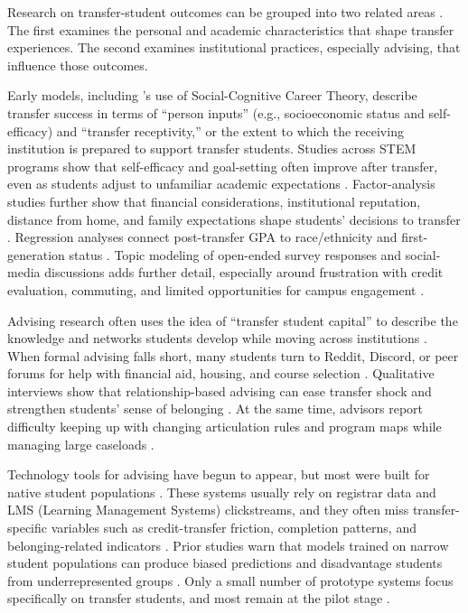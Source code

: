 \documentclass[letterpaper,11pt]{article}
\begin{document}
Research on transfer-student outcomes can be grouped into two related areas \parencite{factoranalysis2023}. The first examines the personal and academic characteristics that shape transfer experiences. The second examines institutional practices, especially advising, that influence those outcomes.

Early models, including \textcite{computingtransfer2024}'s use of Social-Cognitive Career Theory, describe transfer success in terms of ``person inputs'' (e.g., socioeconomic status and self-efficacy) and ``transfer receptivity,'' or the extent to which the receiving institution is prepared to support transfer students. Studies across STEM programs show that self-efficacy and goal-setting often improve after transfer, even as students adjust to unfamiliar academic expectations \parencite{socialcognitive2022}. Factor-analysis studies further show that financial considerations, institutional reputation, distance from home, and family expectations shape students' decisions to transfer \parencite{factoranalysis2023}. Regression analyses connect post-transfer GPA to race/ethnicity and first-generation status \parencite{computingtransfer2024}. Topic modeling of open-ended survey responses and social-media discussions adds further detail, especially around frustration with credit evaluation, commuting, and limited opportunities for campus engagement \parencite{standfast2024reddit}.

Advising research often uses the idea of ``transfer student capital'' to describe the knowledge and networks students develop while moving across institutions \parencite{lukszo2020}. When formal advising falls short, many students turn to Reddit, Discord, or peer forums for help with financial aid, housing, and course selection \parencite{standfast2024reddit}. Qualitative interviews show that relationship-based advising can ease transfer shock and strengthen students' sense of belonging \parencite{thiry2023}. At the same time, advisors report difficulty keeping up with changing articulation rules and program maps while managing large caseloads \parencite{nguyen2024community,nguyen2025school}.

Technology tools for advising have begun to appear, but most were built for native student populations \parencite{nguyen2024community}. These systems usually rely on registrar data and LMS (Learning Management Systems) clickstreams, and they often miss transfer-specific variables such as credit-transfer friction, completion patterns, and belonging-related indicators \parencite{nguyen2024community,nguyen2025school}. Prior studies warn that models trained on narrow student populations can produce biased predictions and disadvantage students from underrepresented groups \parencite{socialcognitive2022,computingtransfer2024}. Only a small number of prototype systems focus specifically on transfer students, and most remain at the pilot stage \parencite{topicmodeling2024}.
\end{document}
